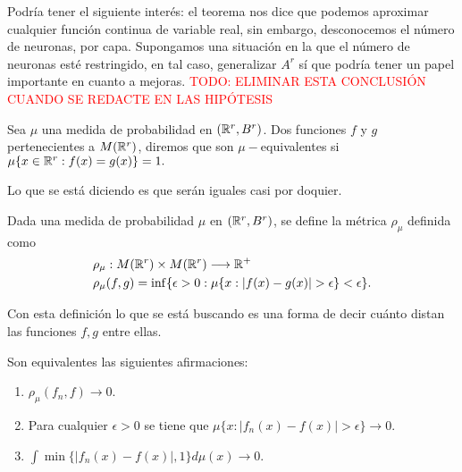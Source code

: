 Podría tener el siguiente interés:
el teorema nos dice que podemos aproximar cualquier función continua de variable real, sin embargo, desconocemos el 
número de neuronas, por capa. Supongamos una situación en la que el número de neuronas esté restringido, en tal caso,
generalizar $A^r$ sí que podría tener un papel importante en cuanto a mejoras. 
\textcolor{red}{TODO: ELIMINAR ESTA CONCLUSIÓN CUANDO SE REDACTE EN LAS HIPÓTESIS}

\begin{definicion} \label{definition:equivalencia_funciones}
    Sea $\mu$ una medida de probabilidad en $(\mathbb{R}^r, B^r)$.  Dos funciones 
    $f$ y $g$ pertenecientes a $M(\mathbb{R}^r)$, diremos que son $\mu -$equivalentes 
    si $\mu\{ x \in \mathbb{R}^r : f(x)=g(x) \} = 1.$
\end{definicion}

Lo que se está diciendo es que serán iguales casi por doquier.   


\begin{definicion}  \label{definition:distancia-probabilidad}
    Dada una medida de probabilidad $\mu$ en $(\mathbb{R}^r, B^r)$, se define 
    la métrica $\rho_{\mu}$ definida como 
    \begin{equation}
        \begin{split}
            & \rho_{\mu} : M(\mathbb{R}^r) \times M(\mathbb{R}^r) \longrightarrow \mathbb{R}^+ \\
            & \rho_{\mu}(f,g) = \inf \{ \epsilon > 0: \mu \{ x : |f(x) - g(x)| > \epsilon \} < \epsilon \}.
        \end{split}
    \end{equation}
\end{definicion}  

Con esta definición lo que se está buscando es una forma de decir cuánto 
distan las funciones $f,g$ entre ellas.  


\begin{lema}\label{lema:caracterizacionConvergenciaSucesiones2_1}
    Son equivalentes las siguientes afirmaciones: 
    \begin{enumerate}
        \item $\rho_{\mu}(f_n, f) \longrightarrow 0$.
        \item Para cualquier  $\epsilon > 0$ se tiene que $\mu \{  x : |f_n(x) - f(x)| > \epsilon \} \longrightarrow 0$.
        \item $\int \min \{ |f_n(x) - f(x)|, 1\} d\mu(x) \longrightarrow 0.$
    \end{enumerate}
\end{lema}

